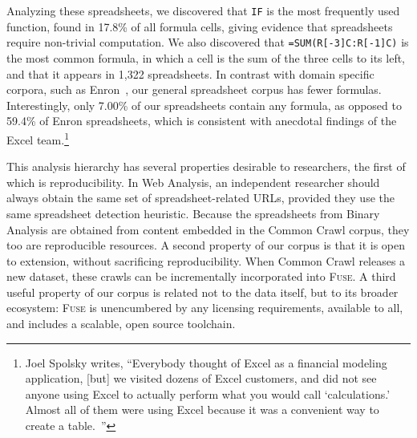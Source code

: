 \documentclass{svjour3}
\begin{document}
Analyzing these spreadsheets, we discovered that \texttt{IF} is the most frequently used function, found in 17.8\% of all formula cells, giving evidence that spreadsheets require non-trivial computation. We also discovered that \texttt{=SUM(R[-3]C:R[-1]C)} is the most common formula, in which a cell is the sum of the three cells to its left, and that it appears in 1,322 spreadsheets. In contrast with domain specific corpora, such as Enron~\cite{Hermans2015}, our general spreadsheet corpus has fewer formulas. Interestingly, only 7.00\% of our spreadsheets contain any formula, as opposed to 59.4\% of Enron spreadsheets, which is consistent with anecdotal findings of the Excel team.\footnote{Joel Spolsky writes, ``Everybody thought of Excel as a financial modeling application, [but] we visited dozens of Excel customers, and did not see anyone using Excel to actually perform what you would call `calculations.' Almost all of them were using Excel because it was a convenient way to create a table.~\cite{JoelOnSoftware}''}




This analysis hierarchy has several properties desirable to researchers, the first of which is reproducibility.
In Web Analysis, an independent researcher should always obtain the same set of spreadsheet-related URLs, provided they use the same spreadsheet detection heuristic.
Because the spreadsheets from Binary Analysis are obtained from content embedded in the Common Crawl corpus, they too are reproducible resources. A second property of our corpus is that it is open to extension, without sacrificing reproducibility. When Common Crawl releases a new dataset, these crawls can be incrementally incorporated into \textsc{Fuse}. A third useful property of our corpus is related not to the data itself, but to its broader ecosystem: \textsc{Fuse} is unencumbered by any licensing requirements, available to all, and includes a scalable, open source toolchain.


\end{document}
